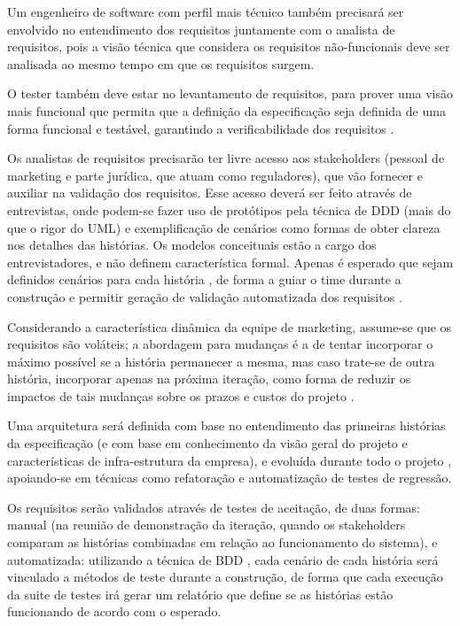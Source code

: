 \documentclass[12pt,journal,compsoc]{IEEEtran}
\begin{document}
Um engenheiro de software com perfil mais técnico também precisará ser envolvido no entendimento dos requisitos juntamente com o analista de requisitos, pois a visão técnica que considera os requisitos não-funcionais deve ser analisada ao mesmo tempo em que os requisitos surgem.

O tester também deve estar no levantamento de requisitos, para prover uma visão mais funcional que permita que a definição da especificação seja definida de uma forma funcional e testável, garantindo a verificabilidade dos requisitos \cite{society_software_2004}. %

Os analistas de requisitos precisarão ter livre acesso aos stakeholders (pessoal
de marketing e parte jurídica, que atuam como reguladores), que vão fornecer e
auxiliar na validação dos requisitos. Esse acesso deverá ser feito através de
entrevistas, onde podem-se fazer uso de protótipos pela técnica de DDD \cite{evans_domain-driven_2004}  
(mais do que o rigor do UML) e exemplificação de
cenários como formas de obter clareza nos detalhes das histórias. Os modelos
conceituais estão a cargo dos entrevistadores, e não definem característica
formal. Apenas é esperado que sejam definidos cenários para cada história
\cite{washington2003using}, de forma a guiar o time durante a construção e
permitir geração de validação automatizada dos requisitos
\cite{melnik_multiple_2007}.

Considerando a característica dinâmica da equipe de marketing, assume-se que os requisitos são voláteis; a abordagem para mudanças é a de tentar incorporar o máximo possível se a história permanecer a mesma, mas caso trate-se de outra história, incorporar apenas na próxima iteração, como forma de reduzir os impactos de tais mudanças sobre os prazos e custos do projeto \cite{zowghi2002study}.

Uma arquitetura será definida com base no entendimento das primeiras histórias da especificação (e com base em conhecimento da visão geral do projeto e características de infra-estrutura da empresa), e evoluída durante todo o projeto \cite{cohn_agile_2009}, apoiando-se em técnicas como refatoração e automatização de testes de regressão.

Os requisitos serão validados através de testes de aceitação, de duas formas:
manual (na reunião de demonstração da iteração, quando os stakeholders comparam
as histórias combinadas em relação ao funcionamento do sistema), e
automatizada: utilizando a técnica de BDD \cite{chelimsky2010rspec}, cada
cenário de cada história será vinculado a métodos de teste durante a
construção, de forma que cada execução da suite de testes irá gerar um
relatório que define se as histórias estão funcionando de acordo com o
esperado.
\end{document}
